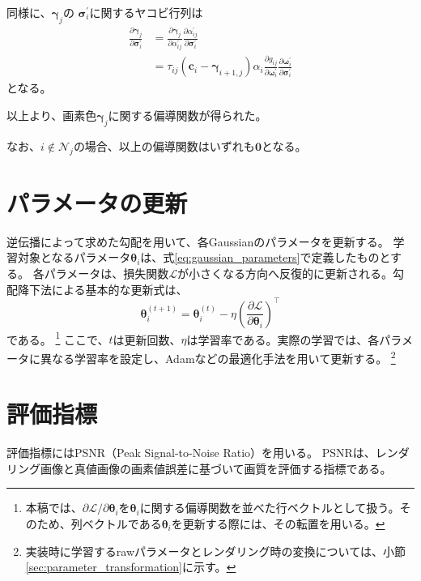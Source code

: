 \documentclass[dvipdfmx]{jlreq}
\begin{document}
同様に、$\bm{\gamma}_j$の
$\bm{\sigma}_i^{\prime}$に関するヤコビ行列は
\begin{equation}
    \begin{aligned}
        \frac{\partial\bm{\gamma}_j}{\partial\bm{\sigma}_i^{\prime}} &= \frac{\partial\bm{\gamma}_j}{\partial\alpha_{ij}^{\prime}} \frac{\partial\alpha_{ij}^{\prime}}{\partial\bm{\sigma}_i^{\prime}}\\
        &= \tau_{ij} \left(\bm{c}_i-\bm{\gamma}_{i+1,j}\right) \alpha_i \frac{\partial g_{ij}}{\partial\bm{\omega}_i^{\prime}} \frac{\partial\bm{\omega}_i^{\prime}}{\partial\bm{\sigma}_i^{\prime}}
    \end{aligned}
    \label{eq:pixel_color_covariance_jacobian}
\end{equation}
となる。

以上より、画素色$\bm{\gamma}_j$に関する偏導関数が得られた。

なお、$i\notin\mathcal{N}_j$の場合、以上の偏導関数はいずれも$\bm{0}$となる。

\section{パラメータの更新}
逆伝播によって求めた勾配を用いて、各Gaussianのパラメータを更新する。
学習対象となるパラメータ$\bm{\theta}_i$は、式\eqref{eq:gaussian_parameters}で定義したものとする。
各パラメータは、損失関数$\mathcal{L}$が小さくなる方向へ反復的に更新される。勾配降下法による基本的な更新式は、
\begin{equation}
    \bm{\theta}_i^{(t+1)} = \bm{\theta}_i^{(t)} - \eta \left(\frac{\partial\mathcal{L}}{\partial\bm{\theta}_i}\right)^{\top}
    \label{eq:gradient_descent_update}
\end{equation}
である。
\footnote{本稿では、$\partial\mathcal{L}/\partial\bm{\theta}_i$を$\bm{\theta}_i$に関する偏導関数を並べた行ベクトルとして扱う。そのため、列ベクトルである$\bm{\theta}_i$を更新する際には、その転置を用いる。}
ここで、$t$は更新回数、$\eta$は学習率である。実際の学習では、各パラメータに異なる学習率を設定し、Adamなどの最適化手法を用いて更新する。
\footnote{実装時に学習するrawパラメータとレンダリング時の変換については、小節\ref{sec:parameter_transformation}に示す。}

\section{評価指標}
評価指標にはPSNR（Peak Signal-to-Noise Ratio）を用いる。
PSNRは、レンダリング画像と真値画像の画素値誤差に基づいて画質を評価する指標である。
\end{document}
